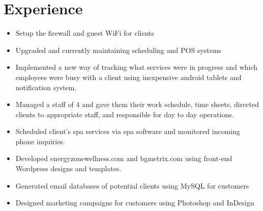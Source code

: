 \documentclass[12pt,letterpaper,sans]{moderncv}        %
\begin{document}
\section{Experience}
{\begin{itemize}%
\item Setup the firewall and guest WiFi for clients
\item Upgraded and currently maintaining scheduling and POS systems
\item Implemented a new way of tracking what services were in progress and which employees were busy with a client using inexpensive android tablets and notification system.
\end{itemize}}
{\begin{itemize}%
\item Managed a staff of 4 and gave them their work schedule, time sheets, directed clients to appropriate staff, and responsible for day to day operations.
\item Scheduled client’s spa services via spa software and monitored incoming phone inquiries.
\end{itemize} }
{\begin{itemize}%
\item Developed energyzonewellness.com and bgmetrix.com using front-end Wordpress designs and templates.
\item Generated email databases of potential clients using MySQL for customers
\item Designed marketing campaigns for customers using Photoshop and InDesign
\end{itemize}
  }
\end{document}
